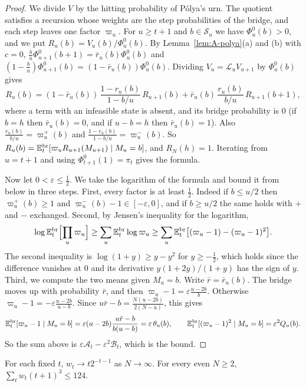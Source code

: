 \begin{proof}
We divide $V$ by the hitting probability of P\'olya's urn. The quotient
satisfies a recursion whose weights are the step probabilities of the
bridge, and each step leaves one factor $\varpi_u$.
For $u\ge t+1$ and $b\in\mathcal S_u$ we have $\Phi^0_u(b)>0$, and we put
$R_u(b)=V_u(b)/\Phi^0_u(b)$. By Lemma~\ref{lem:A-polya}(a) and (b) with
$c=0$, $\frac bu\Phi^0_{u+1}(b+1)=\bar r_u(b)\Phi^0_u(b)$ and
$(1-\frac bu)\Phi^0_{u+1}(b)=(1-\bar r_u(b))\Phi^0_u(b)$. Dividing
$V_u=\mathcal L_uV_{u+1}$ by $\Phi^0_u(b)$ gives
\[
 R_u(b)=(1-\bar r_u(b))\,\frac{1-r_u(b)}{1-b/u}\,R_{u+1}(b)
 +\bar r_u(b)\,\frac{r_u(b)}{b/u}\,R_{u+1}(b+1),
\]
where a term with an infeasible state is absent, and its bridge probability
is $0$ (if $b=h$ then $\bar r_u(b)=0$, and if $u-b=h$ then $\bar r_u(b)=1$).
Also $\frac{r_u(b)}{b/u}=\varpi^+_u(b)$ and
$\frac{1-r_u(b)}{1-b/u}=\varpi^-_u(b)$. So
$R_u(b)=\mathbb{E}^{\mathrm{br}}_t[\varpi_uR_{u+1}(M_{u+1})\mid M_u=b]$, and
$R_N(h)=1$. Iterating from $u=t+1$ and using $\Phi^0_{t+1}(1)=\pi_t$ gives
the formula.

Now let $0<\varepsilon\le\frac12$. We take the logarithm of the formula and
bound it from below in three steps. First, every factor is at least
$\frac12$. Indeed if $b\le u/2$ then $\varpi^+_u(b)\ge1$ and
$\varpi^-_u(b)-1\in[-\varepsilon,0]$, and if $b\ge u/2$ the same holds with
$+$ and $-$ exchanged. Second, by Jensen's inequality for the logarithm,
\[
 \log\mathbb{E}^{\mathrm{br}}_t\Bigl[\prod_u\varpi_u\Bigr]
 \ge\sum_u\mathbb{E}^{\mathrm{br}}_t\log\varpi_u
 \ge\sum_u\mathbb{E}^{\mathrm{br}}_t\bigl[(\varpi_u-1)-(\varpi_u-1)^2\bigr].
\]
The second inequality is $\log(1+y)\ge y-y^2$ for $y\ge-\frac12$, which holds
since the difference vanishes at $0$ and its derivative $y(1+2y)/(1+y)$ has
the sign of $y$. Third, we compute the two means given $M_u=b$. Write
$\bar r=\bar r_u(b)$. The bridge moves up with probability $\bar r$, and
then $\varpi_u-1=\varepsilon\frac{u-2b}b$. Otherwise
$\varpi_u-1=-\varepsilon\frac{u-2b}{u-b}$. Since
$u\bar r-b=\frac{N(u-2b)}{2(N-u)}$, this gives
\[
 \mathbb{E}^{\mathrm{br}}_t[\varpi_u-1\mid M_u=b]=\varepsilon(u-2b)\frac{u\bar r-b}{b(u-b)}
 =\varepsilon\,\theta_u(b),\qquad
 \mathbb{E}^{\mathrm{br}}_t[(\varpi_u-1)^2\mid M_u=b]=\varepsilon^2Q_u(b).
\]
So the sum above is $\varepsilon \mathcal A_t-\varepsilon^2\mathcal B_t$, which is the bound.
\end{proof}

\begin{lemma}\label{lem:A-w}
For each fixed $t$, $w_t\to t2^{-t-1}$ as $N\to\infty$. For every even
$N\ge2$, $\sum_tw_t(t+1)^3\le124$.
\end{lemma}


